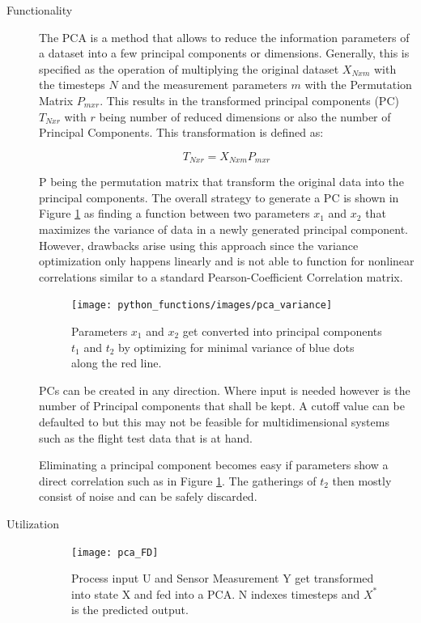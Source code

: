\begin{description}
    \item[Functionality]\hfill

    The PCA is a method that allows to reduce the information parameters of a dataset into a few principal components or dimensions. Generally, this is specified as the operation of multiplying the original dataset $X_{Nxm}$ with the timesteps $N$ and the measurement parameters $m$ with the Permutation Matrix $P_{mxr}$. This results in the transformed principal components (PC) $T_{Nxr}$ with $r$ being number of reduced dimensions or also the number of Principal Components. This transformation is defined as:

    $$T_{Nxr} = X_{Nxm}  P_{mxr}$$

    P being the permutation matrix that transform the original data into the principal components. The overall strategy to generate a PC is shown in Figure \ref{fig:pca_variance} as finding a function between two parameters $x_1$ and $x_2$ that maximizes the variance of data in a newly generated principal component. However, drawbacks arise using this approach since the variance optimization only happens linearly and is not able to function for nonlinear correlations similar to a standard Pearson-Coefficient Correlation matrix. \cite{handl_multivariate_2017}

    \begin{figure}[h]
        \centering
        \texttt{[image: python\_functions/images/pca\_variance]}
        \caption[Illustration of a singular PCA Transformation]{Parameters $x_1$ and $x_2$ get converted into principal components $t_1$ and $t_2$ by optimizing for minimal variance of blue dots along the red line.}
        \label{fig:pca_variance}
    \end{figure}

    PCs can be created in any direction. Where input is needed however is the number of Principal components that shall be kept. A cutoff value can be defaulted to but this may not be feasible for multidimensional systems such as the flight test data that is at hand.


    Eliminating a principal component becomes easy if parameters show a direct correlation such as in Figure \ref{fig:pca_variance}. The gatherings of $t_2$ then mostly consist of noise and can be safely discarded.

    \item[Utilization]\hfill

    \begin{figure}[h]
        \vspace{-20pt}
        \centering
        \texttt{[image: pca\_FD]}
        \caption[PCA for residual generation in FMEA]{Process input U and Sensor Measurement Y get transformed into state X and fed into a PCA. N indexes timesteps and $X^*$ is the predicted output.\cite[p.268]{isermann_fault-diagnosis_2006}}
        \label{fig:pca_FD}
    \end{figure}


\end{description}
